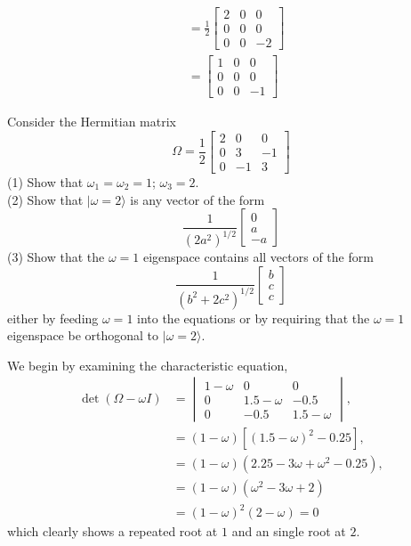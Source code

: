 \documentclass[../principles-of-quantum-mechanics.tex]{subfiles}
\begin{document}
\begin{questions}
\begin{solution}
\begin{align*}
		&= \frac{1}{2}\begin{bmatrix}2 & 0 & 0\\ 0 & 0 & 0\\ 0 & 0 & -2\end{bmatrix} \\
		&= \begin{bmatrix}1 & 0 & 0 \\ 0 & 0 & 0 \\ 0 & 0 & -1\end{bmatrix}
	\end{align*}
\end{solution}

\question Consider the Hermitian matrix
\[
	\Omega = \frac{1}{2}\begin{bmatrix}2 & 0 & 0 \\ 0 & 3 & {-1} \\ 0 & {-1} & {3} \end{bmatrix}
\]
(1) Show that $\omega_1=\omega_2=1$; $\omega_3=2$. \\
(2) Show that $|\omega=2\rangle$ is any vector of the form
\[
	\frac{1}{(2a^2)^{1/2}}\begin{bmatrix}0 \\ a \\ -a\end{bmatrix}
\]
(3) Show that the $\omega=1$ eigenspace contains all vectors of the form
\[
	\frac{1}{(b^2+2c^2)^{1/2}}\begin{bmatrix}b \\ c \\ c\end{bmatrix}
\]
either by feeding $\omega=1$ into the equations or by requiring that the $\omega=1$ eigenspace be orthogonal to $|\omega=2\rangle$.

\begin{solution}
	We begin by examining the characteristic equation,
	\begin{align*}
		\det(\Omega-\omega{I}) &= \begin{vmatrix}1 - \omega & 0 & 0 \\ 0 & 1.5 - \omega & -0.5 \\ 0 & -0.5 & 1.5 - \omega\end{vmatrix}, \\
		&= (1-\omega)[(1.5-\omega)^2 - 0.25], \\
		&= (1 - \omega)(2.25 - 3\omega + \omega^2 - 0.25), \\
		&= (1 - \omega)(\omega^2 - 3\omega + 2) \\
		&= (1 - \omega)^2(2 - \omega) = 0
	\end{align*}
	which clearly shows a repeated root at $1$ and an single root at $2$.
	

\end{solution}
\end{questions}
\end{document}
